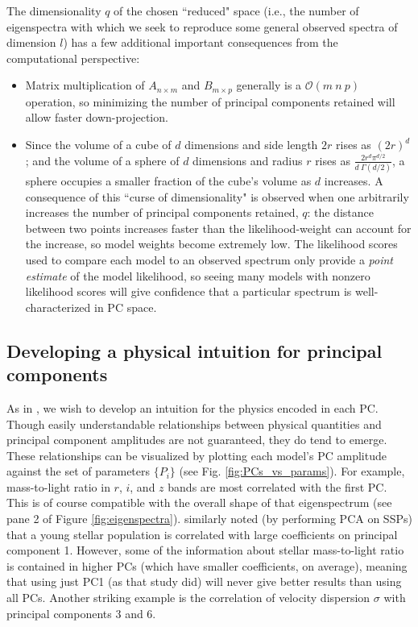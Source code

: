 The dimensionality $q$ of the chosen ``reduced" space (i.e., the number of eigenspectra with which we seek to reproduce some general observed spectra of dimension $l$) has a few additional important consequences from the computational perspective:
\begin{itemize}
    \itemsep0em
    \item Matrix multiplication of $A_{n \times m}$ and $B_{m \times p}$ generally is a $\mathcal{O}(m~n~p)$ operation, so minimizing the number of principal components retained will allow faster down-projection.
    \item Since the volume of a cube of $d$ dimensions and side length $2 r$ rises as $(2r)^d$; and the volume of a sphere of $d$ dimensions and radius $r$ rises as $\frac{2 r^d \pi^{d/2}}{d ~ \Gamma(d/2)}$, a sphere occupies a smaller fraction of the cube's volume as $d$ increases. A consequence of this ``curse of dimensionality" is observed when one arbitrarily increases the number of principal components retained, $q$: the distance between two points increases faster than the likelihood-weight can account for the increase, so model weights become extremely low. The likelihood scores used to compare each model to an observed spectrum only provide a \emph{point estimate} of the model likelihood, so seeing many models with nonzero likelihood scores will give confidence that a particular spectrum is well-characterized in PC space.
\end{itemize}

\subsection{Developing a physical intuition for principal components}
\label{chap1:subsec:pc_meaning}

As in , we wish to develop an intuition for the physics encoded in each PC. Though easily understandable relationships between physical quantities and principal component amplitudes are not guaranteed, they do tend to emerge. These relationships can be visualized by plotting each model's PC amplitude against the set of parameters $\{P_i\}$ (see Fig. \ref{fig:PCs_vs_params}). For example, mass-to-light ratio in $r$, $i$, and $z$ bands are most correlated with the first PC. This is of course compatible with the overall shape of that eigenspectrum (see pane 2 of Figure \ref{fig:eigenspectra}). \citet{kong_01_pca} similarly noted (by performing PCA on SSPs) that a young stellar population is correlated with large coefficients on principal component 1. However, some of the information about stellar mass-to-light ratio is contained in higher PCs (which have smaller coefficients, on average), meaning that using just PC1 (as that study did) will never give better results than using all PCs. Another striking example is the correlation of velocity dispersion $\sigma$ with principal components 3 and 6.

